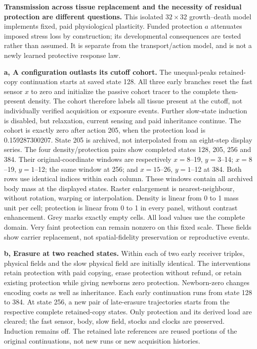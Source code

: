 \textbf{Transmission across tissue replacement and the necessity of residual protection are different questions.}
This isolated $32\times32$ growth--death model implements fixed, paid physiological plasticity. Funded protection $a$ attenuates imposed stress loss by construction; its developmental consequences are tested rather than assumed. It is separate from the transport/action model, and is not a newly learned protective response law.

\textbf{a, A configuration outlasts its cutoff cohort.} The unequal-peaks retained-copy continuation starts at saved state 128. All three early branches reset the fast sensor $x$ to zero and initialize the passive cohort tracer to the complete then-present density. The cohort therefore labels all tissue present at the cutoff, not individually verified acquisition or exposure events. Further slow-state induction is disabled, but relaxation, current sensing and paid inheritance continue. The cohort is exactly zero after action 205, when the protection load is 0.159287300207. State 205 is archived, not interpolated from an eight-step display series. The four density/protection pairs show completed states 128, 205, 256 and 384. Their original-coordinate windows are respectively $x=8$--19, $y=3$--14; $x=8$--19, $y=1$--12; the same window at 256; and $x=15$--26, $y=1$--12 at 384. Both rows use identical indices within each column. These windows contain all archived body mass at the displayed states. Raster enlargement is nearest-neighbour, without rotation, warping or interpolation. Density is linear from 0 to 1 mass unit per cell; protection is linear from 0 to 1 in every panel, without contrast enhancement. Grey marks exactly empty cells. All load values use the complete domain. Very faint protection can remain nonzero on this fixed scale. These fields show carrier replacement, not spatial-fidelity preservation or reproductive events.

\textbf{b, Erasure at two reached states.} Within each of two early receiver triples, physical fields and the slow physical field are initially identical. The interventions retain protection with paid copying, erase protection without refund, or retain existing protection while giving newborns zero protection. Newborn-zero changes encoding costs as well as inheritance. Each early continuation runs from state 128 to 384. At state 256, a new pair of late-erasure trajectories starts from the respective complete retained-copy states. Only protection and its derived load are cleared; the fast sensor, body, slow field, stocks and clocks are preserved. Induction remains off. The retained late references are reused portions of the original continuations, not new runs or new acquisition histories.

